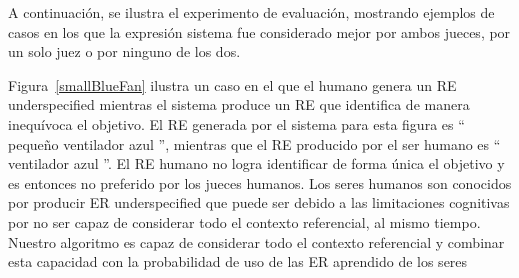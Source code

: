 A continuaci\'on, se ilustra el experimento de evaluaci\'on, mostrando ejemplos de casos en los que la expresi\'on sistema fue considerado mejor por ambos jueces, por un solo juez o por ninguno de los dos.

Figura~\ref{smallBlueFan} ilustra un caso en el que el humano genera un RE underspecified mientras el sistema produce un RE que identifica de manera inequ\'{i}voca el objetivo. El RE generada por el sistema para esta figura es `` peque\~no ventilador azul '', mientras que el RE producido por el ser humano es `` ventilador azul ''. El RE humano no logra identificar de forma \'unica el objetivo y es entonces no preferido por los jueces humanos. Los seres humanos son conocidos por producir ER underspecified que puede ser debido a las limitaciones cognitivas por no ser capaz de considerar todo el contexto referencial, al mismo tiempo. Nuestro algoritmo es capaz de considerar todo el contexto referencial y combinar esta capacidad con la probabilidad de uso de las ER aprendido de los seres 

